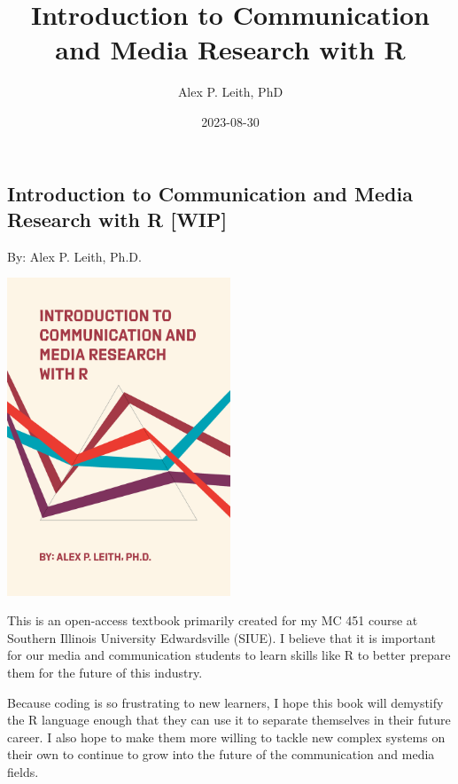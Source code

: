 \documentclass[
  b5paper]{book}
\title{Introduction to Communication and Media Research with R}
\author{Alex P. Leith, PhD}
\date{2023-08-30}
\begin{document}
\maketitle

{
\setcounter{tocdepth}{1}
\tableofcontents
}
\hypertarget{section}{%
\chapter*{}\label{section}}

\hypertarget{introduction-to-communication-and-media-research-with-r-wip}{%
\section*{Introduction to Communication and Media Research with R {[}WIP{]}}\label{introduction-to-communication-and-media-research-with-r-wip}}

By: Alex P. Leith, Ph.D.

\href{Current\%20Book\%20Cover\%20(Art\%20created\%20with\%20R\textquotesingle{}s\%20aRtsy\%20package)}{\includegraphics[width=0.5\textwidth,height=\textheight]{cover_2.png}}

This is an open-access textbook primarily created for my MC 451 course at Southern Illinois University Edwardsville (SIUE). I believe that it is important for our media and communication students to learn skills like R to better prepare them for the future of this industry.

Because coding is so frustrating to new learners, I hope this book will demystify the R language enough that they can use it to separate themselves in their future career. I also hope to make them more willing to tackle new complex systems on their own to continue to grow into the future of the communication and media fields.
\end{document}
